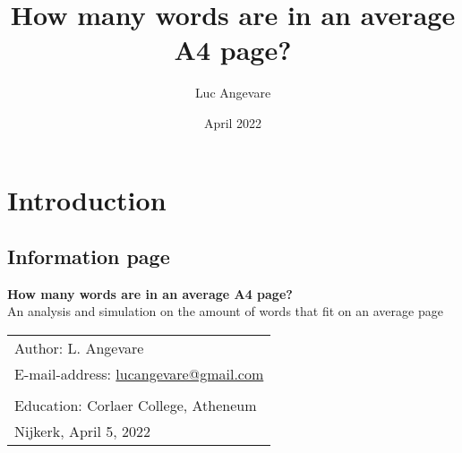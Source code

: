 \documentclass[9pt, a4paper]{article}
\title{How many words are in an average A4 page?}
\author{Luc Angevare}
\date{April 2022}
\begin{document}
\maketitle

\newpage
\section{Introduction}
\subsection{Information page}
\label{sec:information}

\begin{center}
    {\textbf{\Large How many words are in an average A4 page?}}\\
    {\large An analysis and simulation on the amount of words that fit on an average page}
\end{center}
\mbox{}
\vfill

\begin{table}[h]
    \centering
    \begin{tabular}{l}
        Author: L. Angevare\\
        E-mail-address: \href{mailto:lucangevare@gmail.com}{lucangevare@gmail.com}\\
        \\
        Education: Corlaer College, Atheneum\\
        Nijkerk, April 5, 2022 
    \end{tabular}
\end{table}

\newpage
\end{document}
